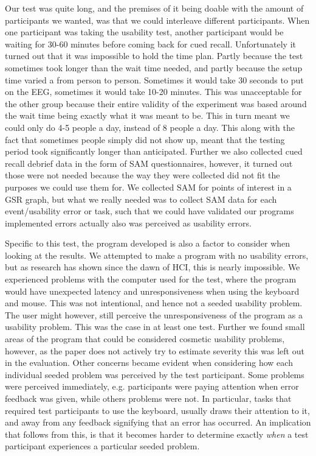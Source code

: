 Our test was quite long, and the premises of it being doable with the amount of participants we wanted, was that we could interleave different participants. 
When one participant was taking the usability test, another participant would be waiting for 30-60 minutes before coming back for cued recall. 
Unfortunately it turned out that it was impossible to hold the time plan. Partly because the test sometimes took longer than the wait time needed, and partly because the setup time varied a from person to person. Sometimes it would take 30 seconds to put on the EEG, sometimes it would take 10-20 minutes. This was unacceptable for the other group because their entire validity of the experiment was based around the wait time being exactly what it was meant to be.
This in turn meant we could only do 4-5 people a day, instead of 8 people a day. 
This along with the fact that sometimes people simply did not show up, meant that the testing period took significantly longer than anticipated. 
Further we also collected cued recall debrief data in the form of SAM questionnaires, however, it turned out those were not needed because the way they were collected did not fit the purposes we could use them for. We collected SAM for points of interest in a GSR graph, but what we really needed was to collect SAM data for each event/usability error or task, such that we could have validated our programs implemented errors actually also was perceived as usability errors. 

Specific to this test, the program developed is also a factor to consider when looking at the results.  We attempted to
make a program with no usability errors, but as research has shown since the dawn of HCI, this is nearly impossible.  We
experienced problems with the computer used for the test, where the program would have unexpected latency and unresponsiveness when using the keyboard and mouse. This was not intentional, and hence not a seeded usability problem.
The user might however, still perceive the unresponsiveness of the program as a usability problem. 
This was the case in at least one test.  
Further we found small areas of the program that could be considered cosmetic usability problems, however, as the paper does not actively try
to estimate severity this was left out in the evaluation. Other concerns became evident when considering how each
individual seeded problem was perceived by the test participant. Some problems were perceived immediately,
e.g. participants were paying attention when error feedback was given, while others problems were not. In particular,
tasks that required test participants to use the keyboard, usually draws their attention to it, and away from any
feedback signifying that an error has occurred. An implication that follows from this, is that it becomes harder to
determine exactly \textit{when} a test participant experiences a particular seeded problem.

